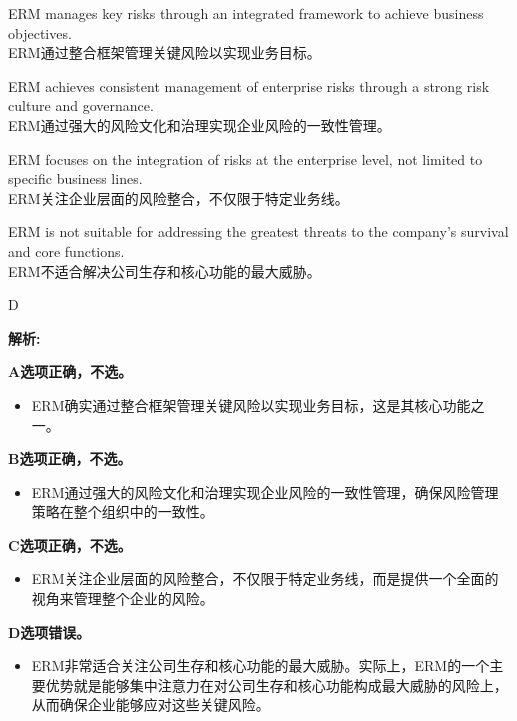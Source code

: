 \documentclass{article}
\newenvironment{explanation}
{\textbf{解析:}\par}
{\par}
\begin{document}
                \begin{choices}
                    \item ERM manages key risks through an integrated framework to achieve business objectives.  \\
                    ERM通过整合框架管理关键风险以实现业务目标。
                    \item ERM achieves consistent management of enterprise risks through a strong risk culture and governance.  \\
                    ERM通过强大的风险文化和治理实现企业风险的一致性管理。
                    \item ERM focuses on the integration of risks at the enterprise level, not limited to specific business lines.  \\
                    ERM关注企业层面的风险整合，不仅限于特定业务线。
                    \item ERM is not suitable for addressing the greatest threats to the company's survival and core functions.  \\
                    ERM不适合解决公司生存和核心功能的最大威胁。
                \end{choices}
                
                \begin{correctanswer}
                D
                \end{correctanswer}
                
                \begin{explanation}
                    \textbf{A选项正确，不选。}
                    \begin{itemize}
                        \item ERM确实通过整合框架管理关键风险以实现业务目标，这是其核心功能之一。
                    \end{itemize}
                
                    \textbf{B选项正确，不选。}
                    \begin{itemize}
                        \item ERM通过强大的风险文化和治理实现企业风险的一致性管理，确保风险管理策略在整个组织中的一致性。
                    \end{itemize}
                
                    \textbf{C选项正确，不选。}
                    \begin{itemize}
                        \item ERM关注企业层面的风险整合，不仅限于特定业务线，而是提供一个全面的视角来管理整个企业的风险。
                    \end{itemize}
                
                    \textbf{D选项错误。}
                    \begin{itemize}
                        \item ERM非常适合关注公司生存和核心功能的最大威胁。实际上，ERM的一个主要优势就是能够集中注意力在对公司生存和核心功能构成最大威胁的风险上，从而确保企业能够应对这些关键风险。
                    \end{itemize}
                \end{explanation}
                
\end{document}
